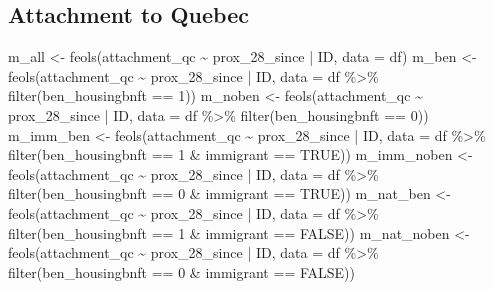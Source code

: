 \documentclass[
  letterpaper,
  DIV=11,
  numbers=noendperiod]{scrartcl}
\newenvironment{Shaded}{\begin{snugshade}}{\end{snugshade}}
\newcommand{\AttributeTok}[1]{\textcolor[rgb]{0.40,0.45,0.13}{#1}}
\newcommand{\ConstantTok}[1]{\textcolor[rgb]{0.56,0.35,0.01}{#1}}
\newcommand{\DecValTok}[1]{\textcolor[rgb]{0.68,0.00,0.00}{#1}}
\newcommand{\FunctionTok}[1]{\textcolor[rgb]{0.28,0.35,0.67}{#1}}
\newcommand{\NormalTok}[1]{\textcolor[rgb]{0.00,0.23,0.31}{#1}}
\newcommand{\OtherTok}[1]{\textcolor[rgb]{0.00,0.23,0.31}{#1}}
\newcommand{\SpecialCharTok}[1]{\textcolor[rgb]{0.37,0.37,0.37}{#1}}
\begin{document}
\hypertarget{attachment-to-quebec-1}{%
\subsection{Attachment to Quebec}\label{attachment-to-quebec-1}}

\begin{Shaded}
\begin{Highlighting}[]
\NormalTok{m\_all }\OtherTok{\textless{}{-}} \FunctionTok{feols}\NormalTok{(attachment\_qc }\SpecialCharTok{\textasciitilde{}}\NormalTok{ prox\_28\_since }\SpecialCharTok{|}\NormalTok{ ID, }\AttributeTok{data =}\NormalTok{ df)}
\NormalTok{m\_ben }\OtherTok{\textless{}{-}} \FunctionTok{feols}\NormalTok{(attachment\_qc }\SpecialCharTok{\textasciitilde{}}\NormalTok{ prox\_28\_since }\SpecialCharTok{|}\NormalTok{ ID,}
               \AttributeTok{data =}\NormalTok{ df }\SpecialCharTok{\%\textgreater{}\%} \FunctionTok{filter}\NormalTok{(ben\_housingbnft }\SpecialCharTok{==} \DecValTok{1}\NormalTok{))}
\NormalTok{m\_noben }\OtherTok{\textless{}{-}} \FunctionTok{feols}\NormalTok{(attachment\_qc }\SpecialCharTok{\textasciitilde{}}\NormalTok{ prox\_28\_since }\SpecialCharTok{|}\NormalTok{ ID,}
                 \AttributeTok{data =}\NormalTok{ df }\SpecialCharTok{\%\textgreater{}\%} \FunctionTok{filter}\NormalTok{(ben\_housingbnft }\SpecialCharTok{==} \DecValTok{0}\NormalTok{))}
\NormalTok{m\_imm\_ben }\OtherTok{\textless{}{-}} \FunctionTok{feols}\NormalTok{(attachment\_qc }\SpecialCharTok{\textasciitilde{}}\NormalTok{ prox\_28\_since }\SpecialCharTok{|}\NormalTok{ ID,}
                   \AttributeTok{data =}\NormalTok{ df }\SpecialCharTok{\%\textgreater{}\%} \FunctionTok{filter}\NormalTok{(ben\_housingbnft }\SpecialCharTok{==} \DecValTok{1} \SpecialCharTok{\&}\NormalTok{ immigrant }\SpecialCharTok{==} \ConstantTok{TRUE}\NormalTok{))}
\NormalTok{m\_imm\_noben }\OtherTok{\textless{}{-}} \FunctionTok{feols}\NormalTok{(attachment\_qc }\SpecialCharTok{\textasciitilde{}}\NormalTok{ prox\_28\_since }\SpecialCharTok{|}\NormalTok{ ID,}
                     \AttributeTok{data =}\NormalTok{ df }\SpecialCharTok{\%\textgreater{}\%} \FunctionTok{filter}\NormalTok{(ben\_housingbnft }\SpecialCharTok{==} \DecValTok{0} \SpecialCharTok{\&}\NormalTok{ immigrant }\SpecialCharTok{==} \ConstantTok{TRUE}\NormalTok{))}
\NormalTok{m\_nat\_ben }\OtherTok{\textless{}{-}} \FunctionTok{feols}\NormalTok{(attachment\_qc }\SpecialCharTok{\textasciitilde{}}\NormalTok{ prox\_28\_since }\SpecialCharTok{|}\NormalTok{ ID,}
                   \AttributeTok{data =}\NormalTok{ df }\SpecialCharTok{\%\textgreater{}\%} \FunctionTok{filter}\NormalTok{(ben\_housingbnft }\SpecialCharTok{==} \DecValTok{1} \SpecialCharTok{\&}\NormalTok{ immigrant }\SpecialCharTok{==} \ConstantTok{FALSE}\NormalTok{))}
\NormalTok{m\_nat\_noben }\OtherTok{\textless{}{-}} \FunctionTok{feols}\NormalTok{(attachment\_qc }\SpecialCharTok{\textasciitilde{}}\NormalTok{ prox\_28\_since }\SpecialCharTok{|}\NormalTok{ ID,}
                     \AttributeTok{data =}\NormalTok{ df }\SpecialCharTok{\%\textgreater{}\%} \FunctionTok{filter}\NormalTok{(ben\_housingbnft }\SpecialCharTok{==} \DecValTok{0} \SpecialCharTok{\&}\NormalTok{ immigrant }\SpecialCharTok{==} \ConstantTok{FALSE}\NormalTok{))}


\end{Highlighting}
\end{Shaded}
\end{document}
